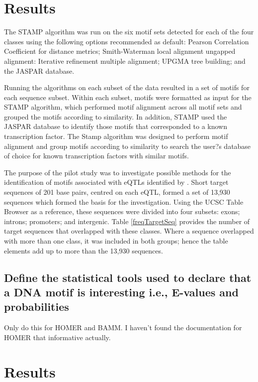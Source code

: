 \documentclass[12pt, onecolumn, oneside]{gsajnl}
\begin{document}
\section{Results}

The STAMP algorithm was run on the six motif sets detected for each of the four classes using the following options recommended as default: 
Pearson Correlation Coefficient for distance metrics; Smith-Waterman local alignment ungapped alignment: Iterative refinement multiple 
alignment; UPGMA tree building; and the JASPAR database.

Running the algorithms on each subset of the data resulted in a set of motifs for each sequence subset. Within each subset, motifs were formatted as input for the STAMP algorithm, which performed motif alignment across all motif sets and grouped the motifs according to similarity. In addition, STAMP used the JASPAR database \citep{sandelin2004jaspar} to identify those motifs that corresponded to a known transcription factor. The Stamp algorithm \citep{mahony2007stamp} was designed to perform motif alignment and group motifs according to similarity to search the user?s
 database of choice for known transcription factors with similar motifs. 
 
The purpose of the pilot study was to investigate possible methods for the identification of motifs associated with eQTLs identified by \citet{lloyd2017genetic}. Short target sequences of 201 base pairs, centred on each eQTL, formed a set of 13,930 sequences which formed the basis for the investigation. Using the UCSC Table Browser \cite{karolchik2004ucsc} as a reference, these sequences were divided into four subsets: exons; introns; promoters; and intergenic. Table \ref{freqTargetSeq} provides the number of target sequences that overlapped with these classes. Where a sequence overlapped with more than one class, it was included in both groups; hence the table elements add up to more than the 13,930 sequences.

\subsection*{Define the statistical tools used to declare that a DNA motif is interesting i.e., E-values and probabilities}

Only do this for HOMER and BAMM. I haven't found the documentation for HOMER that informative actually.

\section{Results}
\end{document}

